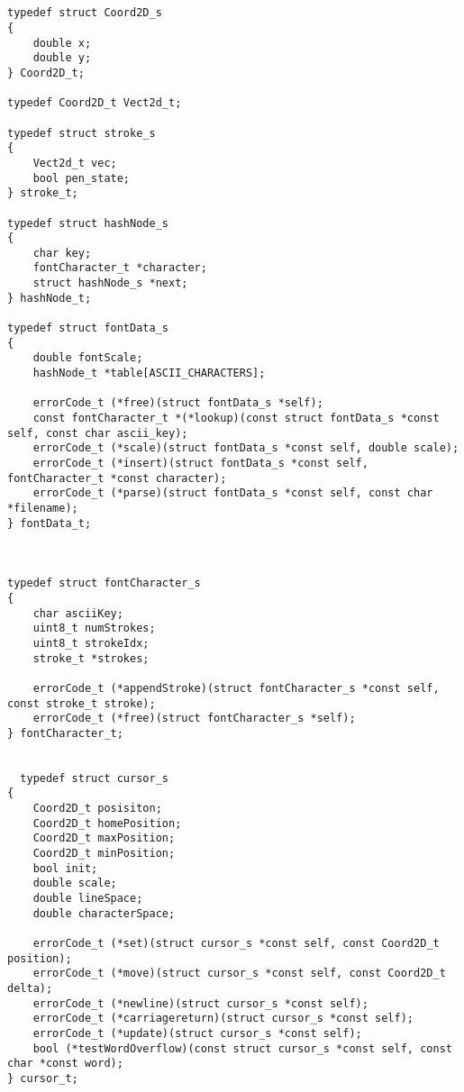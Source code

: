 \begin{verbatim}


typedef struct Coord2D_s
{
    double x;
    double y;
} Coord2D_t;

typedef Coord2D_t Vect2d_t;

typedef struct stroke_s
{
    Vect2d_t vec;   
    bool pen_state; 
} stroke_t;

typedef struct hashNode_s
{
    char key;                   
    fontCharacter_t *character; 
    struct hashNode_s *next;   
} hashNode_t;

typedef struct fontData_s
{
    double fontScale;                    
    hashNode_t *table[ASCII_CHARACTERS]; 

    errorCode_t (*free)(struct fontData_s *self);
    const fontCharacter_t *(*lookup)(const struct fontData_s *const self, const char ascii_key);
    errorCode_t (*scale)(struct fontData_s *const self, double scale);
    errorCode_t (*insert)(struct fontData_s *const self, fontCharacter_t *const character);
    errorCode_t (*parse)(struct fontData_s *const self, const char *filename);
} fontData_t;



typedef struct fontCharacter_s
{
    char asciiKey;      
    uint8_t numStrokes; 
    uint8_t strokeIdx;  
    stroke_t *strokes;  

    errorCode_t (*appendStroke)(struct fontCharacter_s *const self, const stroke_t stroke);
    errorCode_t (*free)(struct fontCharacter_s *self);
} fontCharacter_t;


  typedef struct cursor_s
{
    Coord2D_t posisiton;    
    Coord2D_t homePosition; 
    Coord2D_t maxPosition;  
    Coord2D_t minPosition;  
    bool init;              
    double scale;           
    double lineSpace;       
    double characterSpace;  

    errorCode_t (*set)(struct cursor_s *const self, const Coord2D_t position);
    errorCode_t (*move)(struct cursor_s *const self, const Coord2D_t delta);
    errorCode_t (*newline)(struct cursor_s *const self);
    errorCode_t (*carriagereturn)(struct cursor_s *const self);
    errorCode_t (*update)(struct cursor_s *const self);
    bool (*testWordOverflow)(const struct cursor_s *const self, const char *const word);
} cursor_t;


\end{verbatim}

